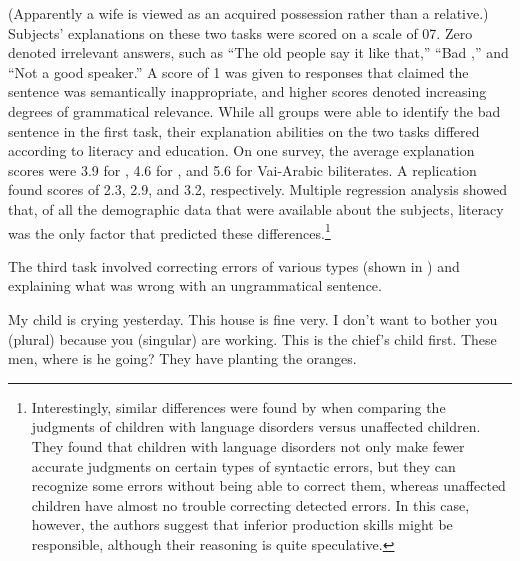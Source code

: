     \z

\noindent
(Apparently a wife is viewed as an acquired possession rather than a relative.) Subjects' explanations on these two tasks were scored on a scale of 0\textendash{}7. Zero denoted irrelevant answers, such as ``The old people say it like that,'' ``Bad ,'' and ``Not a good  speaker.'' A score of 1 was given to responses that claimed the sentence was semantically inappropriate, and higher scores denoted increasing degrees of grammatical relevance. While all groups were able to identify the bad sentence in the first task, their explanation abilities on the two tasks differed according to literacy and education. On one survey, the average explanation scores were 3.9 for , 4.6 for  , and 5.6 for Vai-Arabic biliterates. A replication found scores of 2.3, 2.9, and 3.2, respectively. Multiple regression analysis showed that, of all the demographic data that were available about the subjects,  literacy was the only factor that predicted these differences.\footnote{Interestingly, similar differences were found by \citet{LilesEtAl1977} when comparing the judgments of children with language disorders versus unaffected children. They found that children with language disorders not only make fewer accurate judgments on certain types of syntactic errors, but they can recognize some errors without being able to correct them, whereas unaffected children have almost no trouble correcting detected errors. In this case, however, the authors suggest that inferior production skills might be responsible, although their reasoning is quite speculative.}


The third task involved correcting errors of various types (shown in ) and explaining what was wrong with an ungrammatical sentence.

\ea\label{ex:4:8}
\ea My child is crying yesterday.
\ex This house is fine very.
\ex I don't want to bother you (plural) because you (singular) are working.
\ex This is the chief's child first.
\ex These men, where is he going?
\ex They have planting the oranges.
\z
\z

